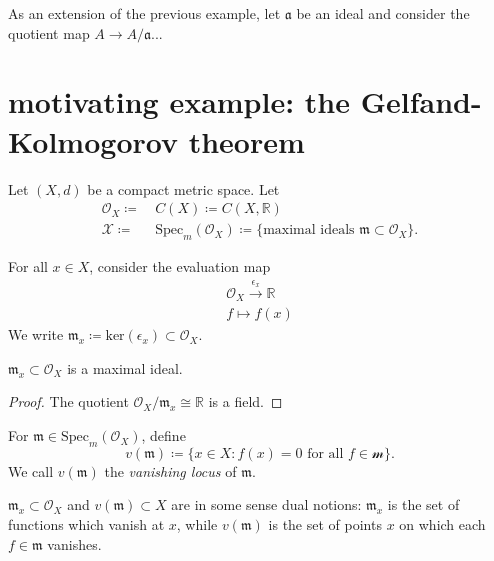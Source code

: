 \documentclass[12pt]{article}
\begin{document}
\begin{example}
	As an extension of the previous example, let $\mathfrak{a}$ be an ideal and consider the quotient map $A\to A/\mathfrak{a}$... 
\end{example}


\section{motivating example: the Gelfand-Kolmogorov theorem} %

\begin{definition}
	Let $(X, d)$ be a compact metric space. Let 
	\begin{align*}
		\mathcal{O}_X \coloneqq& \ C(X) \coloneqq C(X,\mathbb{R}) \\
		\mathcal{X} \coloneqq& \ \text{Spec}_m(\mathcal{O}_X) \coloneqq \{\text{maximal ideals }\mathfrak{m}\subset \mathcal{O}_X \}.
	\end{align*}
\end{definition}

\begin{definition}
	For all $x\in X$, consider the evaluation map 
	\begin{gather*}
		\mathcal{O}_X \overset{\epsilon_x}{\longrightarrow} \mathbb{R} \\
		f \mapsto f(x)
	\end{gather*}
	We write $\mathfrak{m}_x \coloneqq \text{ker}(\epsilon_x) \subset \mathcal{O}_X$.
\end{definition}

\begin{proposition}
	$\mathfrak{m}_x\subset\mathcal{O}_X$ is a maximal ideal. 
\end{proposition}
\begin{proof}
	The quotient $\mathcal{O}_X / \mathfrak{m}_x \cong \mathbb{R}$ is a field.
\end{proof}

\begin{definition}
	For $\mathfrak{m}\in \text{Spec}_m(\mathcal{O}_X)$, define 
	\begin{equation*}
		v(\mathfrak{m}) \coloneqq \{ x\in X : f(x)=0 \text{ for all } f\in\mathcal{m} \}.
	\end{equation*}
	We call $v(\mathfrak{m})$ the \emph{vanishing locus} of $\mathfrak{m}$.
\end{definition}

\begin{remark}
	$\mathfrak{m}_x\subset\mathcal{O}_X$ and $v(\mathfrak{m})\subset X$ are in some sense dual notions: $\mathfrak{m}_x$ is the set of functions which vanish at $x$, while $v(\mathfrak{m})$ is the set of points $x$ on which each $f\in\mathfrak{m}$ vanishes.
\end{remark}
\end{document}
